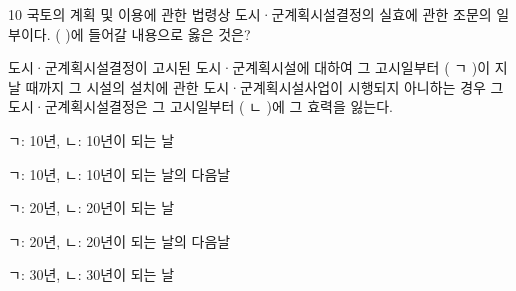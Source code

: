 \begin{question}{10}
국토의 계획 및 이용에 관한 법령상 도시·군계획시설결정의 실효에 관한 조문의 일부이다. ( )에 들어갈 내용으로 옳은 것은?
\begin{framedtext}
도시·군계획시설결정이 고시된 도시·군계획시설에 대하여 그 고시일부터 ( ㄱ )이 지날 때까지 그 시설의 설치에 관한 도시·군계획시설사업이 시행되지 아니하는 경우 그 도시·군계획시설결정은 그 고시일부터 ( ㄴ )에 그 효력을 잃는다. \par
\end{framedtext}
\begin{choices}
  \item ㄱ: 10년, ㄴ: 10년이 되는 날
  \item ㄱ: 10년, ㄴ: 10년이 되는 날의 다음날
  \item ㄱ: 20년, ㄴ: 20년이 되는 날
  \item ㄱ: 20년, ㄴ: 20년이 되는 날의 다음날
  \item ㄱ: 30년, ㄴ: 30년이 되는 날
\end{choices}
\end{question}
